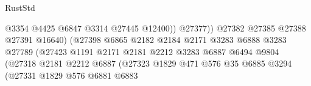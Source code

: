 \begin{lexlean}{RustStd}
\begin{coremodule}
                                                        @3354
                                                        @4425
                                                        @6847
                                                        @3314
                                                        @27445
                                                        @12400))
                                                    @27377))
                                                @27382
                                                @27385
                                                @27388
                                                @27391
                                                @16640)
                                              (@27398
                                                @6865
                                                @2182
                                                @2184
                                                @2171
                                                @3283
                                                @6888
                                                @3283
                                                @27789
                                                (@27423
                                                  @1191
                                                  @2171
                                                  @2181
                                                  @2212
                                                  @3283
                                                  @6887
                                                  @6494
                                                  @9804
                                                  (@27318
                                                    @2181
                                                    @2212
                                                    @6887
                                                    (@27323
                                                      @1829
                                                      @471
                                                      @576
                                                      @35
                                                      @6885
                                                      @3294
                                                      (@27331
                                                        @1829
                                                        @576
                                                        @6881
                                                        @6883

\end{coremodule}
\end{lexlean}
